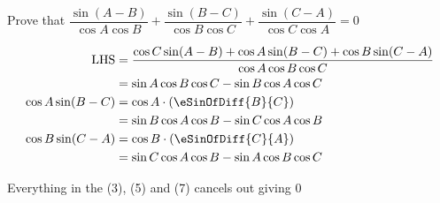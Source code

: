 
%
%
%
%
% 
% 

\question Prove that $\dfrac{\sin(A-B)}{\cos A\cos B} + \dfrac{\sin(B-C)}{\cos B\cos C} 
+ \dfrac{\sin(C-A)}{\cos C\cos A} = 0$

\insertQR{}

\ifprintanswers
\fi 

\begin{solution}
  \begin{fullwidth}
    \begin{align}
      \text{LHS} &= \dfrac{\cos C\sin(A-B) + \cos A\sin(B-C) + 
        \cos B\sin(C-A)}{\cos A\cos B\cos C} \\
           &= \sin A\cos B\cos C - \sin B\cos A\cos C \\
       \cos A\sin(B-C) &= \cos A\cdot(\eSinOfDiff{B}{C}) \\
          &= \sin B\cos A\cos B - \sin C\cos A\cos B \\
       \cos B\sin(C-A) &= \cos B\cdot(\eSinOfDiff{C}{A}) \\
          &= \sin C\cos A\cos B - \sin A\cos B\cos C
    \end{align}

    Everything in the (3), (5) and (7) cancels out giving $0$
  \end{fullwidth}
\end{solution}
